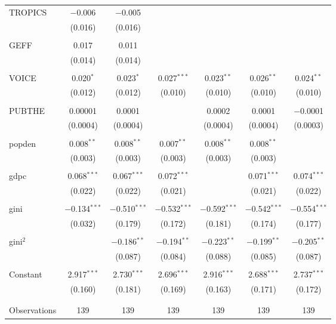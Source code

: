 \documentclass[12pt,a4paper]{article}\usepackage[]{graphicx}\usepackage[]{color}
\begin{document}
\begin{table}[!htbp]
\begin{tabular}{@{\extracolsep{5pt}}lcccccc}
 TROPICS & $-$0.006 & $-$0.005 &  &  &  &  \\ 
  & (0.016) & (0.016) &  &  &  &  \\ 
  & & & & & & \\ 
 GEFF & 0.017 & 0.011 &  &  &  &  \\ 
  & (0.014) & (0.014) &  &  &  &  \\ 
  & & & & & & \\ 
 VOICE & 0.020$^{*}$ & 0.023$^{*}$ & 0.027$^{***}$ & 0.023$^{**}$ & 0.026$^{**}$ & 0.024$^{**}$ \\ 
  & (0.012) & (0.012) & (0.010) & (0.010) & (0.010) & (0.010) \\ 
  & & & & & & \\ 
 PUBTHE & 0.00001 & 0.0001 &  & 0.0002 & 0.0001 & $-$0.0001 \\ 
  & (0.0004) & (0.0004) &  & (0.0004) & (0.0004) & (0.0003) \\ 
  & & & & & & \\ 
 popden & 0.008$^{**}$ & 0.008$^{**}$ & 0.007$^{**}$ & 0.008$^{**}$ & 0.008$^{**}$ &  \\ 
  & (0.003) & (0.003) & (0.003) & (0.003) & (0.003) &  \\ 
  & & & & & & \\ 
 gdpc & 0.068$^{***}$ & 0.067$^{***}$ & 0.072$^{***}$ &  & 0.071$^{***}$ & 0.074$^{***}$ \\ 
  & (0.022) & (0.022) & (0.021) &  & (0.021) & (0.022) \\ 
  & & & & & & \\ 
 gini & $-$0.134$^{***}$ & $-$0.510$^{***}$ & $-$0.532$^{***}$ & $-$0.592$^{***}$ & $-$0.542$^{***}$ & $-$0.554$^{***}$ \\ 
  & (0.032) & (0.179) & (0.172) & (0.181) & (0.174) & (0.177) \\ 
  & & & & & & \\ 
 gini$^2$ &  & $-$0.186$^{**}$ & $-$0.194$^{**}$ & $-$0.223$^{**}$ & $-$0.199$^{**}$ & $-$0.205$^{**}$ \\ 
  &  & (0.087) & (0.084) & (0.088) & (0.085) & (0.087) \\ 
  & & & & & & \\ 
 Constant & 2.917$^{***}$ & 2.730$^{***}$ & 2.696$^{***}$ & 2.916$^{***}$ & 2.688$^{***}$ & 2.737$^{***}$ \\ 
  & (0.160) & (0.181) & (0.169) & (0.163) & (0.171) & (0.172) \\ 
  & & & & & & \\ 
\hline \\[-1.8ex] 
Observations & 139 & 139 & 139 & 139 & 139 & 139 \\ 

\end{tabular}
\end{table}
\end{document}
